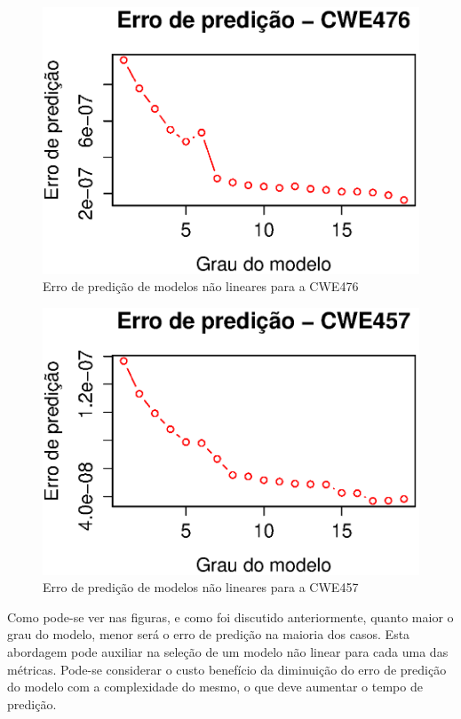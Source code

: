 \begin{figure}[h]
  \centering
  \includegraphics[width=1.0\textwidth]
      {figuras/cwe476-geral.eps}
      \caption{Erro de predição de modelos não lineares para a CWE476}
  \label{fig:cwe476_geral}
\end{figure}

\begin{figure}[h]
  \centering
  \includegraphics[width=1.0\textwidth]
      {figuras/cwe457-geral.eps}
      \caption{Erro de predição de modelos não lineares para a CWE457}
  \label{fig:cwe457_geral}
\end{figure}


Como pode-se ver nas figuras, e como foi discutido anteriormente, quanto maior o
grau do modelo, menor será o erro de predição na maioria dos casos. Esta
abordagem pode auxiliar na seleção de um modelo não linear para cada uma das
métricas. Pode-se considerar o custo benefício da diminuição do erro de predição do
modelo com a complexidade do mesmo, o que deve aumentar o tempo de predição.
